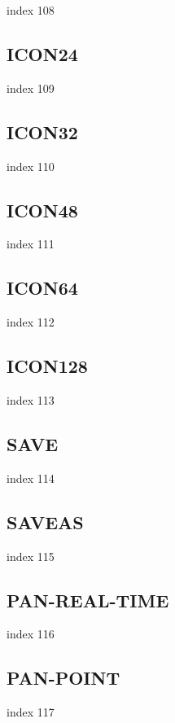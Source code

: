\documentclass[a4paper]{report}
\begin{document}
index 108

\subsection{ICON24}

index 109

\subsection{ICON32}

index 110

\subsection{ICON48}

index 111

\subsection{ICON64}

index 112

\subsection{ICON128}

index 113

\subsection{SAVE}

index 114

\subsection{SAVEAS}

index 115

\subsection{PAN-REAL-TIME}

index 116

\subsection{PAN-POINT}

index 117
\end{document}
